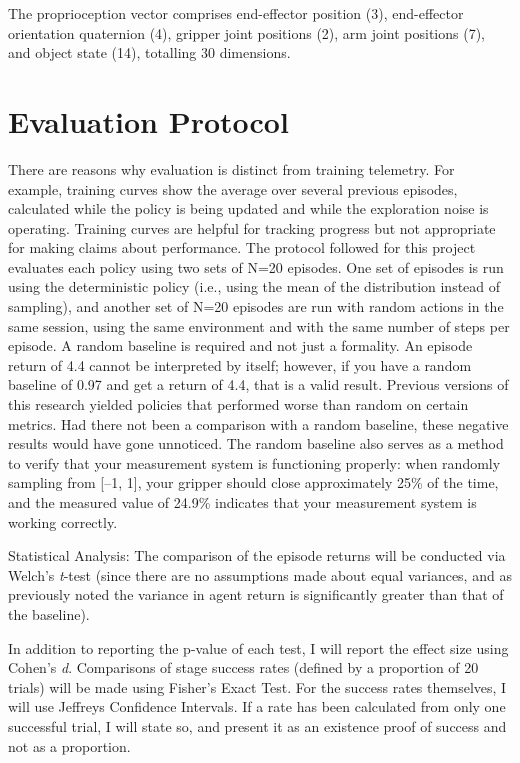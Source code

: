 \documentclass[12pt,a4paper,oneside]{report}
\begin{document}
The proprioception vector comprises end-effector position (3), end-effector
orientation quaternion (4), gripper joint positions (2), arm joint positions
(7), and object state (14), totalling 30 dimensions.

\hypertarget{evaluation-protocol}{%
\section{Evaluation Protocol}\label{evaluation-protocol}}
There are reasons why evaluation is distinct from training telemetry.
For example, training curves show the average over several previous episodes, calculated while the policy is being updated and while the exploration noise is operating. Training curves are helpful for tracking progress but not appropriate for making claims about performance. The protocol followed for this project evaluates each policy using two sets of N=20 episodes. One set of episodes is run using the deterministic policy (i.e., using the mean of the distribution instead of sampling), and another set of N=20 episodes are run with random actions in the same session, using the same environment and with the same number of steps per episode. A random baseline is required and not just a formality. An episode return of 4.4 cannot be interpreted by itself; however, if you have a random baseline of 0.97 and get a return of 4.4, that is a valid result. Previous versions of this research yielded policies that performed worse than random on certain metrics. Had there not been a comparison with a random baseline, these negative results would have gone unnoticed. The random baseline also serves as a method to verify that your measurement system is functioning properly: when randomly sampling from {[}--1, 1{]}, your gripper should close approximately 25\% of the time, and the measured value of 24.9\% indicates that your measurement system is working correctly.

Statistical Analysis: The comparison of the episode returns will be conducted via Welch's \emph{t}-test (since there are no assumptions made about equal variances, and as previously noted the variance in agent return is significantly greater than that of the baseline).

In addition to reporting the p-value of each test, I will report the effect size using Cohen's \emph{d}. Comparisons of stage success rates (defined by a proportion of 20 trials) will be made using Fisher's Exact Test. For the success rates themselves, I will use Jeffreys Confidence Intervals. If a rate has been calculated from only one successful trial, I will state so, and present it as an existence proof of success and not as a proportion.
\end{document}
